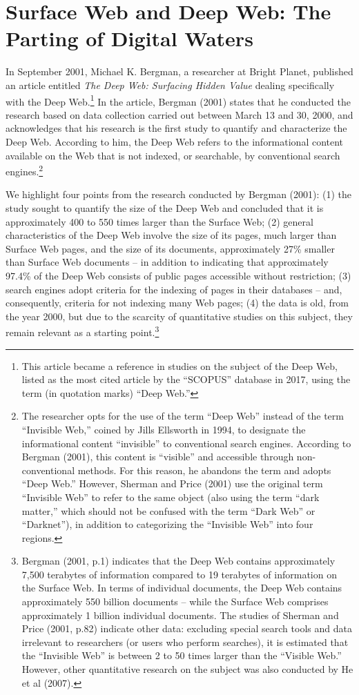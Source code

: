 \section{Surface Web and Deep Web: The Parting of Digital Waters}

In September 2001, Michael K. Bergman, a researcher at Bright Planet, published an article entitled \textit{The Deep Web: Surfacing Hidden Value} dealing specifically with the Deep Web.\footnote{This article became a reference in studies on the subject of the Deep Web, listed as the most cited article by the ``SCOPUS'' database in 2017, using the term (in quotation marks) ``Deep Web.''} In the article, Bergman (2001) states that he conducted the research based on data collection carried out between March 13 and 30, 2000, and acknowledges that his research is the first study to quantify and characterize the Deep Web. According to him, the Deep Web refers to the informational content available on the Web that is not indexed, or searchable, by conventional search engines.\footnote{The researcher opts for the use of the term ``Deep Web'' instead of the term ``Invisible Web,'' coined by Jills Ellsworth in 1994, to designate the informational content ``invisible'' to conventional search engines. According to Bergman (2001), this content is ``visible'' and accessible through non-conventional methods. For this reason, he abandons the term and adopts ``Deep Web.'' However, Sherman and Price (2001) use the original term ``Invisible Web'' to refer to the same object (also using the term ``dark matter,'' which should not be confused with the term ``Dark Web'' or ``Darknet''), in addition to categorizing the ``Invisible Web'' into four regions.}

We highlight four points from the research conducted by Bergman (2001): (1) the study sought to quantify the size of the Deep Web and concluded that it is approximately 400 to 550 times larger than the Surface Web; (2) general characteristics of the Deep Web involve the size of its pages, much larger than Surface Web pages, and the size of its documents, approximately 27\% smaller than Surface Web documents -- in addition to indicating that approximately 97.4\% of the Deep Web consists of public pages accessible without restriction; (3) search engines adopt criteria for the indexing of pages in their databases -- and, consequently, criteria for not indexing many Web pages; (4) the data is old, from the year 2000, but due to the scarcity of quantitative studies on this subject, they remain relevant as a starting point.\footnote{Bergman (2001, p.1) indicates that the Deep Web contains approximately 7,500 terabytes of information compared to 19 terabytes of information on the Surface Web. In terms of individual documents, the Deep Web contains approximately 550 billion documents -- while the Surface Web comprises approximately 1 billion individual documents. The studies of Sherman and Price (2001, p.82) indicate other data: excluding special search tools and data irrelevant to researchers (or users who perform searches), it is estimated that the ``Invisible Web'' is between 2 to 50 times larger than the ``Visible Web.'' However, other quantitative research on the subject was also conducted by He et al (2007).}

